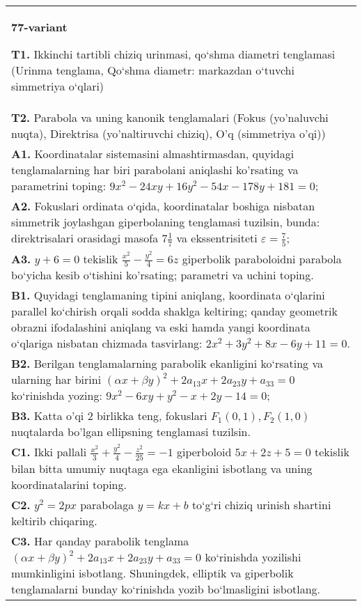 \documentclass{article}
\begin{document}
\begin{tabular}{m{17cm}}
\textbf{77-variant}
\newline

\textbf{T1.} Ikkinchi tartibli chiziq urinmasi, qo‘shma diametri tenglamasi (Urinma tenglama, Qo‘shma diametr: markazdan o‘tuvchi simmetriya o‘qlari) \\
\textbf{T2.} Parabola va uning kanonik tenglamalari (Fokus (yo’naluvchi nuqta), Direktrisa (yo’naltiruvchi chiziq), O’q (simmetriya o’qi)) \\
\textbf{A1.} Koordinatalar sistemasini almashtirmasdan, quyidagi tenglamalarning har biri parabolani aniqlashi ko'rsating va parametrini toping: $9 x^2-24 x y+16 y^2-54 x-178 y+181=0$; \\
\textbf{A2.} Fokuslari ordinata o‘qida, koordinatalar boshiga nisbatan simmetrik joylashgan giperbolaning tenglamasi tuzilsin, bunda: direktrisalari orasidagi masofa $7 \frac{1}{7}$ va ekssentrisiteti $\varepsilon=\frac{7}{5}$; \\
\textbf{A3.} $y+6=0$ tekislik $\frac{x^2}{5}-\frac{y^2}{4}=6 z$ giperbolik paraboloidni parabola bo‘yicha kesib o‘tishini ko'rsating; parametri va uchini toping. \\
\textbf{B1.} Quyidagi tenglamaning tipini aniqlang, koordinata o‘qlarini parallel ko‘chirish orqali sodda shaklga keltiring; qanday geometrik obrazni ifodalashini aniqlang va eski hamda yangi koordinata o‘qlariga nisbatan chizmada tasvirlang: $2 x^2+3 y^2+8 x-6 y+11=0$. \\
\textbf{B2.} Berilgan tenglamalarning parabolik ekanligini ko‘rsating va ularning har birini $(\alpha x+\beta y)^2+2 a_{13} x+2 a_{23} y+a_{33}=0$ ko‘rinishda yozing: $9 x^2-6 x y+y^2-x+2 y-14=0$; \\
\textbf{B3.} Katta o'qi 2 birlikka teng, fokuslari $F_1(0,1), F_2(1,0)$ nuqtalarda bo'lgan ellipsning tenglamasi tuzilsin. \\
\textbf{C1.} Ikki pallali $\frac{x^2}{3}+\frac{y^2}{4}-\frac{z^2}{25}=-1$ giperboloid $5 x+2 z+5=0$ tekislik bilan bitta umumiy nuqtaga ega ekanligini isbotlang va uning koordinatalarini toping. \\
\textbf{C2.} $y^2=2 p x$ parabolaga $y=k x+b$ to‘g‘ri chiziq urinish shartini keltirib chiqaring. \\
\textbf{C3.} Har qanday parabolik tenglama $ (\alpha x+\beta y) ^2+2a_{13}x+2a_{23}y+a_{33}=0$ ko‘rinishda yozilishi mumkinligini isbotlang. Shuningdek, elliptik va giperbolik tenglamalarni bunday ko‘rinishda yozib bo‘lmasligini isbotlang. \\

\end{tabular}
\vspace{1cm}
\end{document}
